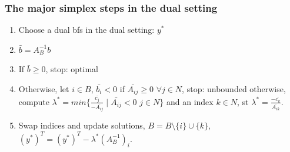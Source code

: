 \documentclass[main]{subfiles}
\begin{document}
\subsubsection{The major simplex steps in the dual setting}
\begin{enumerate}
\item Choose a dual bfs in the dual setting: $y^*$
\item $\bar{b} = A^{-1}_B b$
\item If $\bar{b} \geq 0$, stop: optimal
\item Otherwise, let $i \in B$, $\bar{b_i} < 0$
\subitem if $\bar{A_{ij}} \geq 0$ $\forall j \in N$, stop: unbounded
\subitem otherwise, compute $\lambda^* = min \{\frac{\bar{c_j}}{-\bar{A_{ij}}}
\mid \bar{A_{ij}} < 0$ $j \in N \}$ and an index $k \in N$, st $\lambda^* =
\frac{-\bar{c_k}}{\bar{A_{ik}}}$.
\item Swap indices and update solutions, $B = B\setminus \{i\} \cup \{k\}$, 
$(y^*)^T = (y^*)^T - \lambda^* (A^{-1}_B)_i$.
\end{enumerate}
\end{document}

